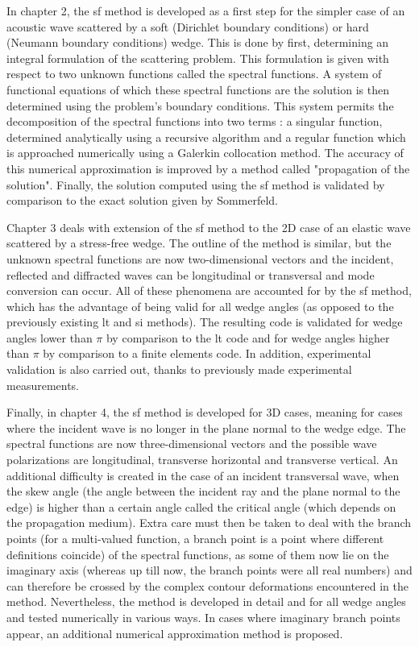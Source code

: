 In chapter 2, the \acrfull{sf} method is developed as a first step for the simpler case of an acoustic wave scattered by a soft (Dirichlet boundary conditions) or hard (Neumann boundary conditions) wedge. This is done by first, determining an integral formulation of the scattering problem. This formulation is given with respect to two unknown functions called the spectral functions. A system of functional equations of which these spectral functions are the solution is then determined using the problem's boundary conditions. This system permits the decomposition of the spectral functions into two terms : a singular function, determined analytically using a recursive algorithm and a regular function which is approached numerically using a Galerkin collocation method. The accuracy of this numerical approximation is improved by a method called "propagation of the solution". Finally, the solution computed using the \acrlong{sf} method is validated by comparison to the exact solution given by Sommerfeld.

Chapter 3 deals with extension of the \acrlong{sf} method to the 2D case of an elastic wave scattered by a stress-free wedge. The outline of the method is similar, but the unknown spectral functions are now two-dimensional vectors and the incident, reflected and diffracted waves can be longitudinal or transversal and mode conversion can occur. All of these phenomena are accounted for by the \acrlong{sf} method, which has the advantage of being valid for all wedge angles (as opposed to the previously existing \acrfull{lt} and \acrfull{si} methods). The resulting code is validated for wedge angles lower than $\pi$ by comparison to the \acrshort{lt} code and for wedge angles higher than $\pi$ by comparison to a finite elements code. In addition, experimental validation is also carried out, thanks to previously made experimental measurements.

Finally, in chapter 4, the \acrlong{sf} method is developed for 3D cases, meaning for cases where the incident wave is no longer in the plane normal to the wedge edge. The spectral functions are now three-dimensional vectors and the possible wave polarizations are longitudinal, transverse horizontal and transverse vertical. An additional difficulty is created in the case of an incident transversal wave, when the skew angle (the angle between the incident ray and the plane normal to the edge) is higher than a certain angle called the critical angle (which depends on the propagation medium). Extra care must then be taken to deal with the branch points (for a multi-valued function, a branch point is a point where different definitions coincide) of the spectral functions, as some of them now lie on the imaginary axis (whereas up till now, the branch points were all real numbers) and can therefore be crossed by the complex contour deformations encountered in the method. Nevertheless, the method is developed in detail and for all wedge angles and tested numerically in various ways. In cases where imaginary branch points appear, an additional numerical approximation method is proposed.